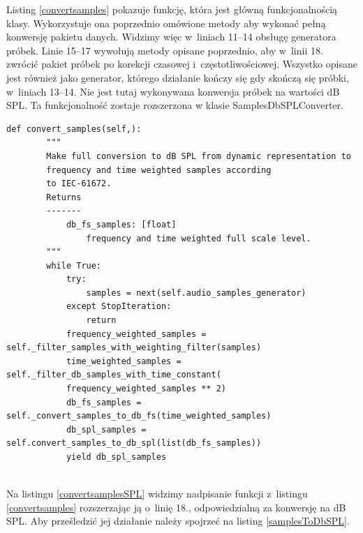 \documentclass[eng,printmode]{mgr}
\begin{document}
Listing \ref{convertsamples} pokazuje funkcję, która jest główną funkcjonalnością klasy. Wykorzystuje ona poprzednio omówione metody aby wykonać pełną konwersję pakietu danych. Widzimy więc w~liniach 11--14 obsługę generatora próbek. Linie 15--17 wywołują metody opisane poprzednio, aby w~linii 18. zwrócić pakiet próbek po korekcji czasowej i~częstotliwościowej. Wszystko opisane jest również jako generator, którego działanie kończy się gdy skończą się próbki, w~liniach 13--14. Nie jest tutaj wykonywana konwersja próbek na wartości dB SPL. Ta funkcjonalność zostaje rozszerzona w klasie SamplesDbSPLConverter.

\begin{minipage}{\linewidth}
\begin{lstlisting}[caption={Fragment kodu źródłowego pliku SampleSPLConverter.py,\newline klasa SamplesDbSPLConverter, metoda convert\_samples},captionpos=b,label={convertsamplesSPL}]
    def convert_samples(self,):
        """
        Make full conversion to dB SPL from dynamic representation to
        frequency and time weighted samples according
        to IEC-61672.
        Returns
        -------
            db_fs_samples: [float]
                frequency and time weighted full scale level.
        """
        while True:
            try:
                samples = next(self.audio_samples_generator)
            except StopIteration:
                return
            frequency_weighted_samples = self._filter_samples_with_weighting_filter(samples)
            time_weighted_samples = self._filter_db_samples_with_time_constant(
            frequency_weighted_samples ** 2)
            db_fs_samples = self._convert_samples_to_db_fs(time_weighted_samples)
            db_spl_samples = self.convert_samples_to_db_spl(list(db_fs_samples))
            yield db_spl_samples
 
\end{lstlisting}
\end{minipage}


Na listingu \ref{convertsamplesSPL} widzimy nadpisanie funkcji z~listingu \ref{convertsamples} rozszerzając ją o~linię 18., odpowiedzialną za konwersję na dB SPL. Aby prześledzić jej działanie należy spojrzeć na listing \ref{samplesToDbSPL}.
\end{document}
